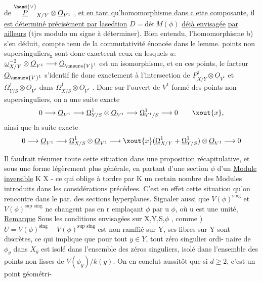 
\uline{de} $\overset{\hand{\vee}}{\underline{P}}_{X/Y}\otimes\underline{O}_{V^1}$ , \uline{et en tant qu'homomorphisme dans c ette composante,}
\uline{il est déterminé précisément par lasedtion} $D = \text{dét}\,M(\phi)$ \uline{déjà envisagée}
\uline{par ailleurs} (tjrs modulo un signe à déterminer). Bien entendu,
l'homomorphisme b) s'en déduit, compte tenu de la commutativité énoncée
dans le lemme.  points non supersinguliers$_{\text{x}}$ sont donc exacteent
ceux en lesquels $\underline{a}$: $\underline{\omega}^{-2}_{X/Y}\otimes\underline{O}_{V^1}\longrightarrow\underline{O}_{\unsure{V}^1}$ est un isomorphisme, et en
ces points,  le facteur $\underline{O}_{\unsure{V}^1}$ s'identif
fie donc exactement à l'intersection de $\underline{P}^1_{X/Y}\otimes\underline{O}_{V^1}$ et $\underline{\Omega}^1_{Y/S}\otimes\underline{O}_{V^1}$
dans $\underline{\Omega}^1_{X/S}\otimes\underline{O}_{V^1}$ . Donc sur l'ouvert de $V^1$ formé des points non
supersinguliers, on a une suite exacte
\[ 0\longrightarrow\underline{O}_{V^1}\longrightarrow\underline{\Omega}^1_{Y/S}\otimes\underline{O}_{V^1}\longrightarrow\underline{\Omega}^1_{V^1/S}\longrightarrow 0 \qquad \xout{x}, \]
ainsi que la suite exacte
\[ 0\longrightarrow\underline{O}_{V^1}\longrightarrow\underline{\Omega}^1_{X/S}\otimes\underline{O}_{V^1}\longrightarrow\xout{x}(\underline{\Omega}^1_{X/Y}+\underline{\Omega}^1_{Y/S})\otimes\underline{O}_{V^1}\longrightarrow 0 \]

\margin{|} Il faudrait résumer  toute cette situation dans une proposition
récapitulative, et sous une forme légèrement plus générale, en partant
d'une section $\phi$ d'un \uline{Module inversible}  K  X - ce qui oblige
à tordre par K un certain nombre des Modules introduits dans les
considérations précédees. C'est en effet  cette situation qu'on
rencontre  dans le par. des sections hyperplanes. Signaler aussi que
\margin{|} $V(\phi)^{\text{sing}}$  et $V(\phi)^{\text{sup sing}}$ ne changent pas en r emplaçant $\phi$ par u $\phi$,
où u est une unité, 
\uline{Remarque} Sous les conditions envisagées sur X,Y,S,$\phi$ , comme )
$U = V(\phi)^{\text{sing}}- V(\phi)^{\text{sup sing}}$ est non ramffié sur Y, ses fibres sur Y sont
discrètes, ce qui implique que pour tout $y\in Y$, tout zéro singulier ordi-%
naire de $\phi_y$ dans $X_y$ est isolé dans l'ensemble des zéros singuliers, 
 isolé dans l'ensemble des points non lisses de $V(\phi_y)/k(y)$.
 On en conclut  aussitôt que si $d\geqslant 2$, c'est un point géométri-%

